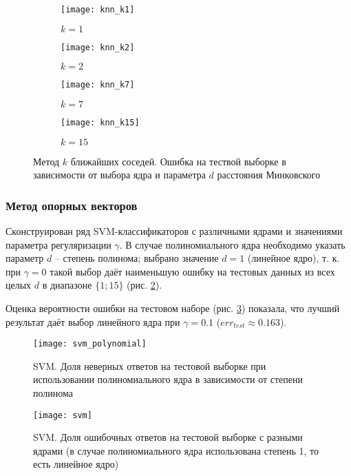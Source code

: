 \documentclass[a4paper,12pt]{article} %
\newcommand{\myPictWidth}{\textwidth}
\begin{document}
\begin{figure}[H]
    \centering
    \begin{subfigure}{.5\textwidth}
        \centering
        \texttt{[image: knn\_k1]}
        \caption{$ k = 1 $}
    \end{subfigure}%
    \begin{subfigure}{.5\textwidth}
        \centering
        \texttt{[image: knn\_k2]}
        \caption{$ k = 2 $}
    \end{subfigure}

    \begin{subfigure}{.5\textwidth}
        \centering
        \texttt{[image: knn\_k7]}
        \caption{$ k = 7 $}
    \end{subfigure}%
    \begin{subfigure}{.5\textwidth}
        \centering
        \texttt{[image: knn\_k15]}
        \caption{$ k = 15 $}
    \end{subfigure}
    \caption{Метод $k$ ближайших соседей. Ошибка на тествой выборке в зависимости от выбора ядра и параметра $d$ расстояния Минковского }
    \label{fig:knn}
\end{figure}

\subsubsection{Метод опорных векторов}

Сконструирован ряд SVM-классификаторов с различными ядрами и значениями параметра регуляризации $ \gamma $.
В случае полиномиального ядра необходимо указать параметр $ d $ -- степень полинома; выбрано значение $ d=1 $ (линейное ядро), т. к. при $ \gamma = 0 $ такой выбор даёт наименьшую ошибку на тестовых данных из всех целых $ d $ в диапазоне $ \{1;15\} $ (рис. \ref{fig:svm_polynomial}).

Оценка вероятности ошибки на тестовом наборе (рис. \ref{fig:svm_kernels}) показала, что лучший результат даёт выбор линейного ядра при $ \gamma = 0.1 $ ($err_{test} \approx 0.163 $).

\begin{figure}[H]
    \centering \texttt{[image: svm\_polynomial]}
    \caption{SVM. Доля неверных ответов на тестовой выборке при использовании полиномиального ядра в зависимости от степени полинома}
    \label{fig:svm_polynomial}
\end{figure}

\begin{figure}[H]
    \centering \texttt{[image: svm]}
    \caption{SVM. Доля ошибочных ответов на тестовой выборке с разными ядрами (в случае полиномиального ядра использована степень 1, то есть линейное ядро)}
    \label{fig:svm_kernels}
\end{figure}
\end{document}
